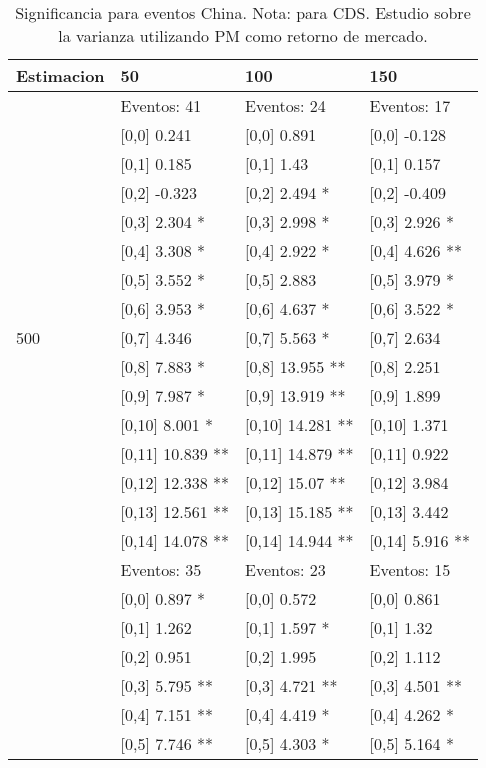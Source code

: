 \begin{table}

\caption{Significancia para eventos China. Nota: para CDS. Estudio sobre la varianza utilizando PM como retorno de mercado.}
\centering
\begin{tabular}[t]{llll}
\toprule
Estimacion & 50 & 100 & 150\\
\midrule
 & Eventos:  41 & Eventos:  24 & Eventos:  17\\
 & {}[0,0] 0.241 & {}[0,0] 0.891 & {}[0,0] -0.128\\
 & {}[0,1] 0.185 & {}[0,1] 1.43 & {}[0,1] 0.157\\
 & {}[0,2] -0.323 & {}[0,2] 2.494 * & {}[0,2] -0.409\\
 & {}[0,3] 2.304 * & {}[0,3] 2.998 * & {}[0,3] 2.926 *\\
\addlinespace
 & {}[0,4] 3.308 * & {}[0,4] 2.922 * & {}[0,4] 4.626 **\\
 & {}[0,5] 3.552 * & {}[0,5] 2.883 & {}[0,5] 3.979 *\\
 & {}[0,6] 3.953 * & {}[0,6] 4.637 * & {}[0,6] 3.522 *\\
500 & {}[0,7] 4.346 & {}[0,7] 5.563 * & {}[0,7] 2.634\\
 & {}[0,8] 7.883 * & {}[0,8] 13.955 ** & {}[0,8] 2.251\\
\addlinespace
 & {}[0,9] 7.987 * & {}[0,9] 13.919 ** & {}[0,9] 1.899\\
 & {}[0,10] 8.001 * & {}[0,10] 14.281 ** & {}[0,10] 1.371\\
 & {}[0,11] 10.839 ** & {}[0,11] 14.879 ** & {}[0,11] 0.922\\
 & {}[0,12] 12.338 ** & {}[0,12] 15.07 ** & {}[0,12] 3.984\\
 & {}[0,13] 12.561 ** & {}[0,13] 15.185 ** & {}[0,13] 3.442\\
\addlinespace
 & {}[0,14] 14.078 ** & {}[0,14] 14.944 ** & {}[0,14] 5.916 **\\
 & Eventos:  35 & Eventos:  23 & Eventos:  15\\
 & {}[0,0] 0.897 * & {}[0,0] 0.572 & {}[0,0] 0.861\\
 & {}[0,1] 1.262 & {}[0,1] 1.597 * & {}[0,1] 1.32\\
 & {}[0,2] 0.951 & {}[0,2] 1.995 & {}[0,2] 1.112\\
\addlinespace
 & {}[0,3] 5.795 ** & {}[0,3] 4.721 ** & {}[0,3] 4.501 **\\
 & {}[0,4] 7.151 ** & {}[0,4] 4.419 * & {}[0,4] 4.262 *\\
 & {}[0,5] 7.746 ** & {}[0,5] 4.303 * & {}[0,5] 5.164 *\\

\end{tabular}
\end{table}
